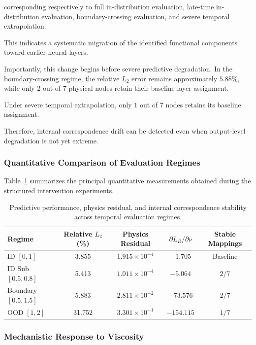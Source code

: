 \documentclass[12pt,singleside,a4paper]{article}
\begin{document}
corresponding respectively to full in-distribution evaluation,
late-time in-distribution evaluation, boundary-crossing evaluation,
and severe temporal extrapolation.

This indicates a systematic migration of the identified functional
components toward earlier neural layers.

Importantly, this change begins before severe predictive degradation.
In the boundary-crossing regime, the relative $L_2$ error remains
approximately $5.88\%$, while only $2$ out of $7$ physical nodes retain
their baseline layer assignment.

Under severe temporal extrapolation, only $1$ out of $7$ nodes retains
its baseline assignment.

Therefore, internal correspondence drift can be detected even when
output-level degradation is not yet extreme.


\subsubsection{Quantitative Comparison of Evaluation Regimes}

Table~\ref{tab:phase3_regimes} summarizes the principal quantitative
measurements obtained during the structured intervention experiments.

\begin{table}[htbp]
\centering
\caption{Predictive performance, physics residual, and internal
correspondence stability across temporal evaluation regimes.}
\label{tab:phase3_regimes}
\begin{tabular}{lcccc}
\hline
\textbf{Regime}
&
\textbf{Relative $L_2$ (\%)}
&
\textbf{Physics Residual}
&
\textbf{$\partial L_R/\partial\nu$}
&
\textbf{Stable Mappings}
\\
\hline
ID $[0,1]$
& 3.855
& $1.915\times10^{-4}$
& $-1.705$
& Baseline
\\
ID Sub $[0.5,0.8]$
& 5.413
& $1.011\times10^{-4}$
& $-5.064$
& $2/7$
\\
Boundary $[0.5,1.5]$
& 5.883
& $2.811\times10^{-2}$
& $-73.576$
& $2/7$
\\
OOD $[1,2]$
& 31.752
& $3.301\times10^{-1}$
& $-154.115$
& $1/7$
\\
\hline
\end{tabular}
\end{table}


\subsubsection{Mechanistic Response to Viscosity}
\end{document}
